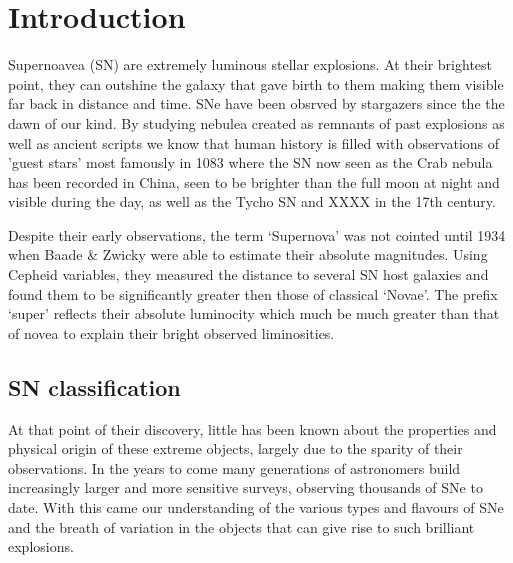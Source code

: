 \chapter{Introduction}  \label{Chapter1}

Supernoavea (SN) are extremely luminous stellar explosions. At their brightest point, they can outshine the galaxy that gave birth to them making them visible far back in distance and time. SNe have been obsrved by stargazers since the the dawn of our kind. By studying nebulea created as remnants of past explosions as well as ancient scripts we know that human history is filled with observations of 'guest stars' most famously in 1083 where the SN now seen as the Crab nebula has been recorded in China, seen to be brighter than the full moon at night and visible during the day, as well as the Tycho SN and XXXX in the 17th century.

Despite their early observations, the term `Supernova' was not cointed until 1934 when Baade \& Zwicky were able to estimate their absolute magnitudes. Using Cepheid variables, they measured the distance to several SN host galaxies and found them to be significantly greater then those of classical `Novae'. The prefix `super' reflects their absolute luminocity which much be much greater than that of novea to explain their bright observed liminosities.

\section{SN classification}
At that point of their discovery, little has been known about the properties and physical origin of these extreme objects, largely due to the sparity of their observations. In the years to come many generations of astronomers build increasingly larger and more sensitive surveys, observing thousands of SNe to date. With this came our understanding of the various types and flavours of SNe and the breath of variation in the objects that can give
rise to such brilliant explosions.


